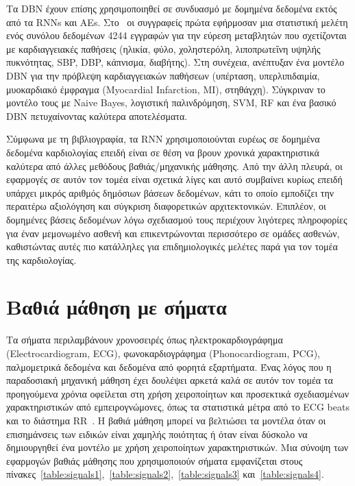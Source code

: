 Τα DBN έχουν επίσης χρησιμοποιηθεί σε συνδυασμό με δομημένα δεδομένα εκτός από τα RNNs και AEs.
Στο~\cite{kim2017statistics} οι συγγραφείς πρώτα εφήρμοσαν μια στατιστική μελέτη ενός συνόλου δεδομένων 4244 εγγραφών για την εύρεση μεταβλητών που σχετίζονται με καρδιαγγειακές παθήσεις (ηλικία, φύλο, χοληστερόλη, λιποπρωτεΐνη υψηλής πυκνότητας, SBP, DBP, κάπνισμα, διαβήτης).
Στη συνέχεια, ανέπτυξαν ένα μοντέλο DBN για την πρόβλεψη καρδιαγγειακών παθήσεων (υπέρταση, υπερλιπιδαιμία, μυοκαρδιακό έμφραγμα (Myocardial Infarction, MI), στηθάγχη).
Σύγκριναν το μοντέλο τους με Naive Bayes, λογιστική παλινδρόμηση, SVM, RF και ένα βασικό DBN πετυχαίνοντας καλύτερα αποτελέσματα.

Σύμφωνα με τη βιβλιογραφία, τα RNN χρησιμοποιούνται ευρέως σε δομημένα δεδομένα καρδιολογίας επειδή είναι σε θέση να βρουν χρονικά χαρακτηριστικά καλύτερα από άλλες μεθόδους βαθιάς/μηχανικής μάθησης.
Από την άλλη πλευρά, οι εφαρμογές σε αυτόν τον τομέα είναι σχετικά λίγες και αυτό συμβαίνει κυρίως επειδή υπάρχει μικρός αριθμός δημόσιων βάσεων δεδομένων, κάτι το οποίο εμποδίζει την περαιτέρω αξιολόγηση και σύγκριση διαφορετικών αρχιτεκτονικών.
Επιπλέον, οι δομημένες βάσεις δεδομένων λόγω σχεδιασμού τους περιέχουν λιγότερες πληροφορίες για έναν μεμονωμένο ασθενή και επικεντρώνονται περισσότερο σε ομάδες ασθενών, καθιστώντας αυτές πιο κατάλληλες για επιδημιολογικές μελέτες παρά για τον τομέα της καρδιολογίας.

\section{Βαθιά μάθηση με σήματα}
\label{sec3:signals}
Τα σήματα περιλαμβάνουν χρονοσειρές όπως ηλεκτροκαρδιογράφημα (Electrocardiogram, ECG), φωνοκαρδιογράφημα (Phonocardiogram, PCG), παλμομετρικά δεδομένα και δεδομένα από φορητά εξαρτήματα.
Ένας λόγος που η παραδοσιακή μηχανική μάθηση έχει δουλέψει αρκετά καλά σε αυτόν τον τομέα τα προηγούμενα χρόνια οφείλεται στη χρήση χειροποίητων και προσεκτικά σχεδιασμένων χαρακτηριστικών από εμπειρογνώμονες, όπως τα στατιστικά μέτρα από το ECG beats και το διάστημα RR~\cite{faziludeen2013ecg}.
Η βαθιά μάθηση μπορεί να βελτιώσει τα μοντέλα όταν οι επισημάνσεις των ειδικών είναι χαμηλής ποιότητας ή όταν είναι δύσκολο να δημιουργηθεί ένα μοντέλο με χρήση χειροποίητων χαρακτηριστικών.
Μια σύνοψη των εφαρμογών βαθιάς μάθησης που χρησιμοποιούν σήματα εμφανίζεται στους πίνακες~\ref{table:signals1},~\ref{table:signals2},~\ref{table:signals3} και~\ref{table:signals4}.

